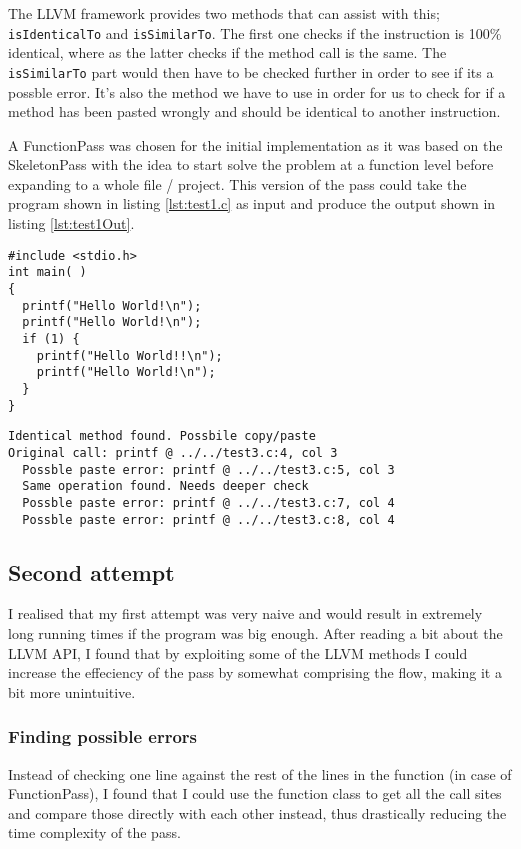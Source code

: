\documentclass[a4paper,11pt]{article}
\theoremstyle{mytheor}
\begin{document}
The LLVM framework provides two methods that can assist with this; \verb!isIdenticalTo! and \verb!isSimilarTo!.
The first one checks if the instruction is 100\% identical, where as the latter checks if the method call is the same.
The \verb!isSimilarTo! part would then have to be checked further in order to see if its a possble error.
It's also the method we have to use in order for us to check for if a method has been pasted wrongly and should be identical to another instruction.

A FunctionPass was chosen for the initial implementation as it was based on the SkeletonPass with the idea to start solve the problem at a function level before expanding to a whole file / project.
This version of the pass could take the program shown in listing \ref{lst:test1.c} as input and produce the output shown in listing \ref{lst:test1Out}.
\begin{lstlisting}[caption={test1.c},label={lst:test1.c}]
#include <stdio.h>
int main( )
{
  printf("Hello World!\n");
  printf("Hello World!\n");
  if (1) {
    printf("Hello World!!\n");
    printf("Hello World!\n");
  }
}
\end{lstlisting}

\begin{lstlisting}[caption={Pass output for test1.c},label={lst:test1Out}]
Identical method found. Possbile copy/paste
Original call: printf @ ../../test3.c:4, col 3
  Possble paste error: printf @ ../../test3.c:5, col 3
  Same operation found. Needs deeper check
  Possble paste error: printf @ ../../test3.c:7, col 4
  Possble paste error: printf @ ../../test3.c:8, col 4
\end{lstlisting}

\subsection*{Second attempt}
I realised that my first attempt was very naive and would result in extremely long running times if the program was big enough.
After reading a bit about the LLVM API, I found that by exploiting some of the LLVM methods I could increase the effeciency of the pass by somewhat comprising the flow, making it a bit more unintuitive.

\subsubsection*{Finding possible errors}
Instead of checking one line against the rest of the lines in the function (in case of FunctionPass),
I found that I could use the function class to get all the call sites and compare those directly with each other
instead, thus drastically reducing the time complexity of the pass.
\end{document}
